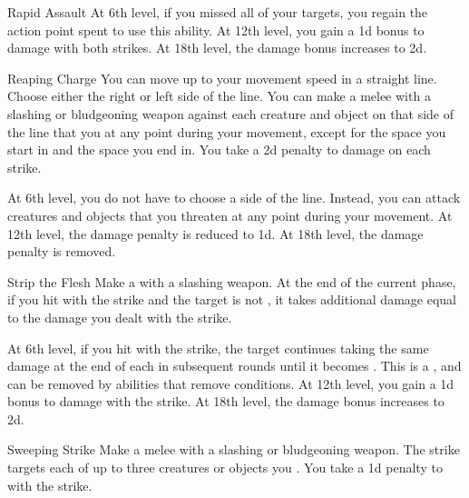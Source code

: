 {\begin{ability}{Rapid Assault}
                At 6th level, if you missed all of your targets, you regain the action point spent to use this ability.
                At 12th level, you gain a \plus1d bonus to damage with both strikes.
                At 18th level, the damage bonus increases to \plus2d.
            \end{ability}

            \begin{ability}{Reaping Charge}
                You can move up to your movement speed in a straight line.
                Choose either the right or left side of the line.
                You can make a melee  with a slashing or bludgeoning weapon against each creature and object on that side of the line that you  at any point during your movement, except for the space you start in and the space you end in.
                You take a \minus2d penalty to damage on each strike.

                At 6th level, you do not have to choose a side of the line.
                Instead, you can attack creatures and objects that you threaten at any point during your movement.
                At 12th level, the damage penalty is reduced to \minus1d.
                At 18th level, the damage penalty is removed.
            \end{ability}

            \begin{ability}{Strip the Flesh}
                Make a  with a slashing weapon.
                At the end of the current phase, if you hit with the strike and the target is not , it takes additional damage equal to the damage you dealt with the strike.

                At 6th level, if you hit with the strike, the target continues taking the same damage at the end of each  in subsequent rounds until it becomes .
                This is a , and can be removed by abilities that remove conditions.
                At 12th level, you gain a \plus1d bonus to damage with the strike.
                At 18th level, the damage bonus increases to \plus2d.
            \end{ability}

            \begin{ability}{Sweeping Strike}
                Make a melee  with a slashing or bludgeoning weapon.
                The strike targets each of up to three creatures or objects you .
                You take a \minus1d penalty to  with the strike.


\end{ability}}
